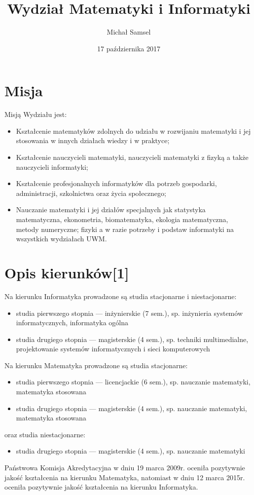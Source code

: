 \documentclass[a4paper,12pt]{article}\upshape
\title{Wydział Matematyki i Informatyki}
\author{Michał Samsel}
\date{17 października 2017}
\begin{document}
\maketitle

\begin{abstract}
\tableofcontents
\end{abstract}

\section{Misja}

Misją Wydziału jest:
\begin{itemize}
\item Kształcenie matematyków zdolnych do udziału w rozwijaniu matematyki i jej stosowania w innych działach wiedzy i w praktyce;
\item Kształcenie nauczycieli matematyki, nauczycieli matematyki z fizyką a także nauczycieli informatyki;
\item Kształcenie profesjonalnych informatyków dla potrzeb gospodarki, administracji, szkolnictwa oraz życia społecznego;
\item Nauczanie matematyki i jej działów specjalnych jak statystyka matematyczna, ekonometria,
biomatematyka, ekologia matematyczna, metody numeryczne; fizyki a w razie potrzeby i podstaw
informatyki na wszystkich wydziałach UWM.
\end{itemize}

\section{Opis kierunków[1]}

Na kierunku Informatyka prowadzone są studia stacjonarne i niestacjonarne:
\begin{itemize}
\item studia pierwszego stopnia --- inżynierskie (7 sem.), sp. inżynieria systemów informatycznych, informatyka ogólna
\item studia drugiego stopnia --- magisterskie (4 sem.), sp. techniki multimedialne, projektowanie systemów informatycznych i sieci komputerowych
\end{itemize}
Na kierunku Matematyka prowadzone są studia stacjonarne: 
\begin{itemize}
\item studia pierwszego stopnia --- licencjackie (6 sem.), sp. nauczanie matematyki, matematyka stosowana
\item studia drugiego stopnia --- magisterskie (4 sem.), sp. nauczanie matematyki, matematyka stosowana
\end{itemize}
oraz studia niestacjonarne:
\begin{itemize}
\item studia drugiego stopnia --- magisterskie (4 sem.), sp. nauczanie matematyki
\end{itemize}
Państwowa Komisja Akredytacyjna w dniu 19 marca 2009r. oceniła pozytywnie jakość kształcenia na kierunku Matematyka, natomiast w dniu 12 marca 2015r.  oceniła pozytywnie jakość kształcenia na kierunku Informatyka.
\end{document}

